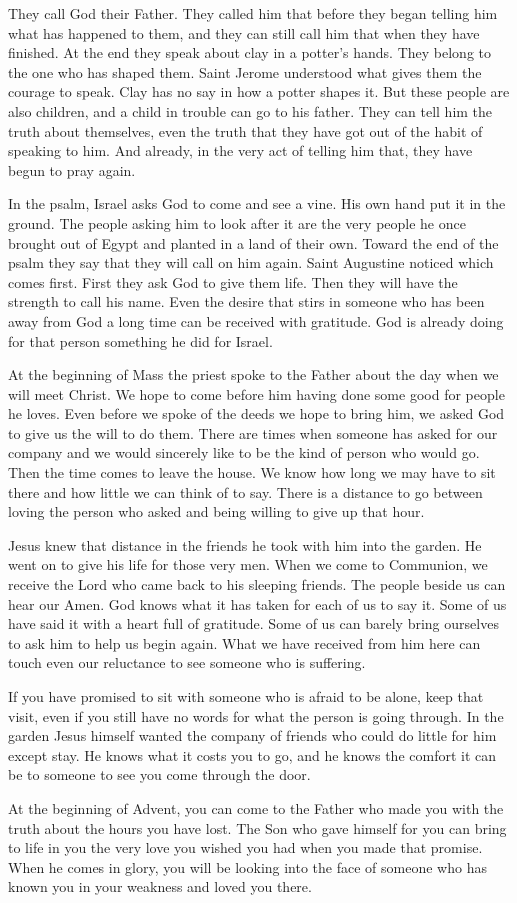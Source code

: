 They call God their Father. They called him that before they began telling him what has happened to them, and they can still call him that when they have finished. At the end they speak about clay in a potter's hands. They belong to the one who has shaped them. Saint Jerome understood what gives them the courage to speak. Clay has no say in how a potter shapes it. But these people are also children, and a child in trouble can go to his father. They can tell him the truth about themselves, even the truth that they have got out of the habit of speaking to him. And already, in the very act of telling him that, they have begun to pray again.

In the psalm, Israel asks God to come and see a vine. His own hand put it in the ground. The people asking him to look after it are the very people he once brought out of Egypt and planted in a land of their own. Toward the end of the psalm they say that they will call on him again. Saint Augustine noticed which comes first. First they ask God to give them life. Then they will have the strength to call his name. Even the desire that stirs in someone who has been away from God a long time can be received with gratitude. God is already doing for that person something he did for Israel.

At the beginning of Mass the priest spoke to the Father about the day when we will meet Christ. We hope to come before him having done some good for people he loves. Even before we spoke of the deeds we hope to bring him, we asked God to give us the will to do them. There are times when someone has asked for our company and we would sincerely like to be the kind of person who would go. Then the time comes to leave the house. We know how long we may have to sit there and how little we can think of to say. There is a distance to go between loving the person who asked and being willing to give up that hour.

Jesus knew that distance in the friends he took with him into the garden. He went on to give his life for those very men. When we come to Communion, we receive the Lord who came back to his sleeping friends. The people beside us can hear our Amen. God knows what it has taken for each of us to say it. Some of us have said it with a heart full of gratitude. Some of us can barely bring ourselves to ask him to help us begin again. What we have received from him here can touch even our reluctance to see someone who is suffering.

If you have promised to sit with someone who is afraid to be alone, keep that visit, even if you still have no words for what the person is going through. In the garden Jesus himself wanted the company of friends who could do little for him except stay. He knows what it costs you to go, and he knows the comfort it can be to someone to see you come through the door.

At the beginning of Advent, you can come to the Father who made you with the truth about the hours you have lost. The Son who gave himself for you can bring to life in you the very love you wished you had when you made that promise. When he comes in glory, you will be looking into the face of someone who has known you in your weakness and loved you there.
